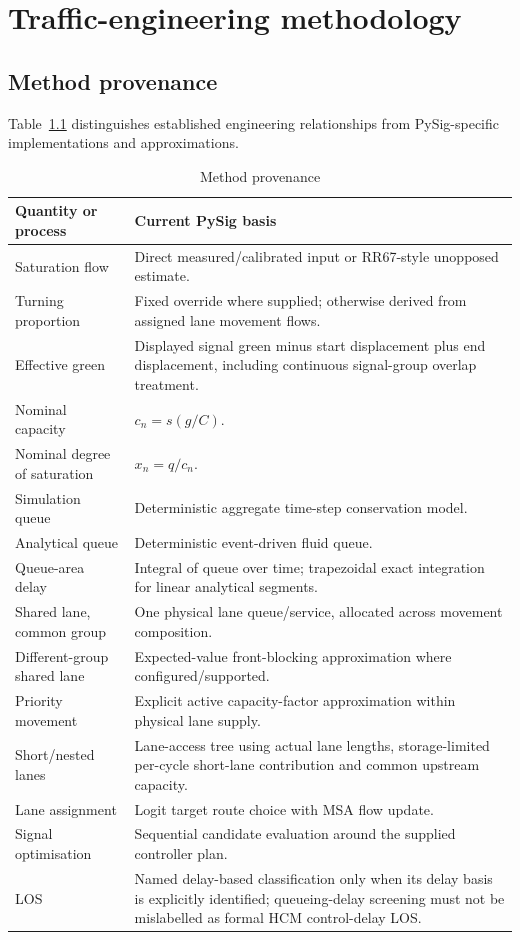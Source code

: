 \chapter{Traffic-engineering methodology}
\label{chap:methodology}

\section{Method provenance}
Table~\ref{tab:method-provenance} distinguishes established engineering relationships
from PySig-specific implementations and approximations.

\begin{longtable}{p{}p{}}
\caption{Method provenance}\label{tab:method-provenance}\\
\toprule
\textbf{Quantity or process} & \textbf{Current PySig basis}\\
\midrule\endhead
Saturation flow & Direct measured/calibrated input or RR67-style unopposed estimate.\\
Turning proportion & Fixed override where supplied; otherwise derived from assigned lane movement flows.\\
Effective green & Displayed signal green minus start displacement plus end displacement, including continuous signal-group overlap treatment.\\
Nominal capacity & $c_n=s(g/C)$.\\
Nominal degree of saturation & $x_n=q/c_n$.\\
Simulation queue & Deterministic aggregate time-step conservation model.\\
Analytical queue & Deterministic event-driven fluid queue.\\
Queue-area delay & Integral of queue over time; trapezoidal exact integration for linear analytical segments.\\
Shared lane, common group & One physical lane queue/service, allocated across movement composition.\\
Different-group shared lane & Expected-value front-blocking approximation where configured/supported.\\
Priority movement & Explicit active capacity-factor approximation within physical lane supply.\\
Short/nested lanes & Lane-access tree using actual lane lengths, storage-limited per-cycle short-lane contribution and common upstream capacity.\\
Lane assignment & Logit target route choice with MSA flow update.\\
Signal optimisation & Sequential candidate evaluation around the supplied controller plan.\\
LOS & Named delay-based classification only when its delay basis is explicitly identified; queueing-delay screening must not be mislabelled as formal HCM control-delay LOS.\\
\bottomrule
\end{longtable}


